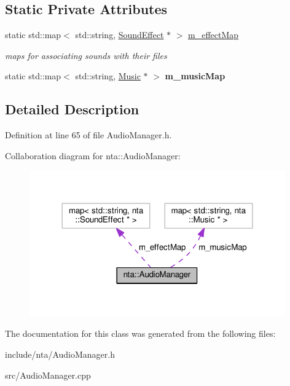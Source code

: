 \subsection*{Static Private Attributes}
\begin{DoxyCompactItemize}
\item 
\mbox{\label{classnta_1_1AudioManager_a745f3ef1216f7e6bf848a9eb4054c5b4}} 
static std\+::map$<$ std\+::string, \hyperlink{classnta_1_1SoundEffect}{Sound\+Effect} $\ast$ $>$ \hyperlink{classnta_1_1AudioManager_a745f3ef1216f7e6bf848a9eb4054c5b4}{m\+\_\+effect\+Map}
\begin{DoxyCompactList}\small\item\em maps for associating sounds with their files \end{DoxyCompactList}\item 
\mbox{\label{classnta_1_1AudioManager_ae301717a98c3a7bb0ca0b588c270b122}} 
static std\+::map$<$ std\+::string, \hyperlink{classnta_1_1Music}{Music} $\ast$ $>$ {\bfseries m\+\_\+music\+Map}
\end{DoxyCompactItemize}


\subsection{Detailed Description}


Definition at line 65 of file Audio\+Manager.\+h.



Collaboration diagram for nta\+:\+:Audio\+Manager\+:
\nopagebreak
\begin{figure}[H]
\begin{center}
\leavevmode
\includegraphics[width=312pt]{d9/d95/classnta_1_1AudioManager__coll__graph}
\end{center}
\end{figure}


The documentation for this class was generated from the following files\+:\begin{DoxyCompactItemize}
\item 
include/nta/Audio\+Manager.\+h\item 
src/Audio\+Manager.\+cpp\end{DoxyCompactItemize}
